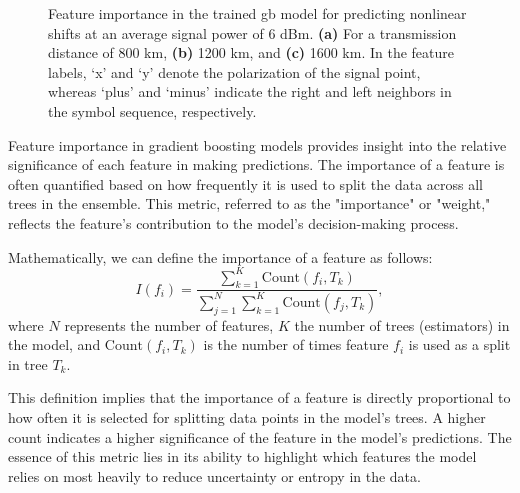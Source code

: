 \begin{figure}[tpb]
    \centering
    \begin{minipage}[h]{0.75\linewidth}
    \end{minipage}
    \caption{Feature importance in the trained \acrshort{gb} model for predicting nonlinear shifts at an average signal power of 6 dBm. \textbf{(a)} For a transmission distance of 800 km, \textbf{(b)} 1200 km, and \textbf{(c)} 1600 km. In the feature labels, `x' and `y' denote the polarization of the signal point, whereas `plus' and `minus' indicate the right and left neighbors in the symbol sequence, respectively.}
    \label{fig:importance_gb}
\end{figure}



Feature importance in gradient boosting models provides insight into the relative significance of each feature in making predictions. The importance of a feature is often quantified based on how frequently it is used to split the data across all trees in the ensemble. This metric, referred to as the "importance" or "weight," reflects the feature's contribution to the model's decision-making process.

Mathematically, we can define the importance of a feature as follows:
\begin{equation}
	I(f_i) = \frac{\sum_{k=1}^{K} \mathrm{Count}(f_i, T_k) }{\sum_{j=1}^{N} \sum_{k=1}^{K} \mathrm{Count}(f_j, T_k)} {,}
\end{equation}
where \(N\) represents the number of features, \(K\) the number of trees (estimators) in the model, and \(\mathrm{Count}(f_i, T_k)\) is the number of times feature \(f_i\) is used as a split in tree \(T_k\).

This definition implies that the importance of a feature is directly proportional to how often it is selected for splitting data points in the model's trees. A higher count indicates a higher significance of the feature in the model's predictions. The essence of this metric lies in its ability to highlight which features the model relies on most heavily to reduce uncertainty or entropy in the data.

